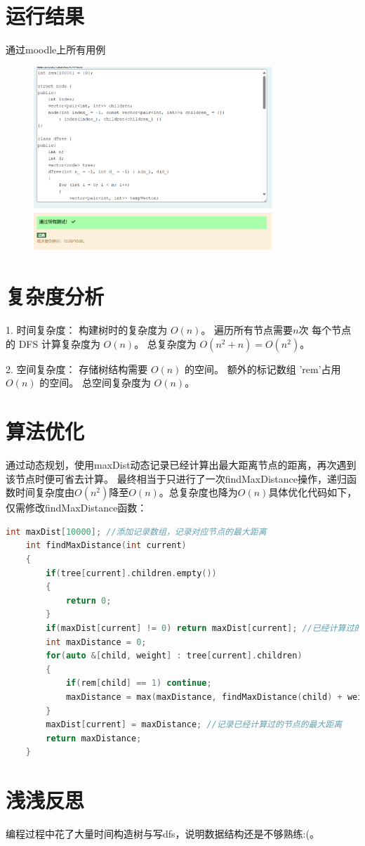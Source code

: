 \documentclass[UTF8]{ctexart}
\begin{document}
\section{运行结果}
通过moodle上所有用例
\begin{figure}[htbp]
    \centering
    \includegraphics[width=0.8\textwidth]{moodle1.png}
\end{figure}

\section{复杂度分析}
1. 时间复杂度：
    构建树时的复杂度为 $O(n)$。
    遍历所有节点需要$n$次
    每个节点的 DFS 计算复杂度为 $O(n)$。
    总复杂度为 $O(n^2+n) = O(n^2)$。


2. 空间复杂度：
    存储树结构需要 $O(n)$ 的空间。
    额外的标记数组 'rem'占用 $O(n)$ 的空间。
    总空间复杂度为 $O(n)$。

\section{算法优化}
通过动态规划，使用maxDist动态记录已经计算出最大距离节点的距离，再次遇到该节点时便可省去计算。
最终相当于只进行了一次findMaxDistance操作，递归函数时间复杂度由$O(n^2)$降至$O(n)$。总复杂度也降为$O(n)$具体优化代码如下，仅需修改findMaxDistance函数：
\begin{lstlisting}[language=C++]
    int maxDist[10000]; //添加记录数组，记录对应节点的最大距离
    int findMaxDistance(int current) 
    {
        if(tree[current].children.empty()) 
        {
            return 0;
        }
        if(maxDist[current] != 0) return maxDist[current]; //已经计算过的节点，直接调用结果
        int maxDistance = 0;
        for(auto &[child, weight] : tree[current].children) 
        {
            if(rem[child] == 1) continue;
            maxDistance = max(maxDistance, findMaxDistance(child) + weight);
        }
        maxDist[current] = maxDistance; //记录已经计算过的节点的最大距离
        return maxDistance;
    }

\end{lstlisting}

\section{浅浅反思}
编程过程中花了大量时间构造树与写dfs，说明数据结构还是不够熟练:(。
\end{document}
